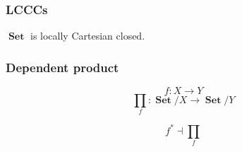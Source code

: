 \documentclass[
xcolor={usenames,dvipsnames,svgnames},
]{beamer}
\DeclareMathOperator{\Set}{\mathbf{Set}}
\begin{document}
  \begin{frame}
    \frametitle{LCCCs}
    \begin{center}
      $\Set$
      is locally Cartesian closed.
    \end{center}
  \end{frame}

  \begin{frame}
    \frametitle{Dependent product}
    \begin{center}

      \[
        f : X \to Y
      \]
      \[
        \prod_f: \Set/X \to \Set/Y
      \]

      \[
        f^\ast \dashv \prod_f
      \]


    \end{center}
  \end{frame}
\end{document}
